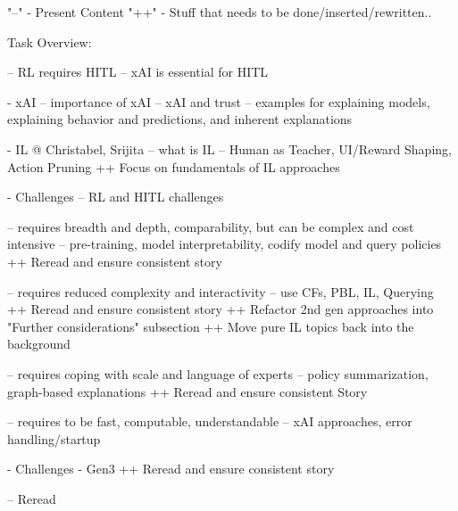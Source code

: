 "--" - Present Content
"++" - Stuff that needs to be done/inserted/rewritten..


Task Overview:

-- RL requires HITL
-- xAI is essential for HITL

- xAI
-- importance of xAI
-- xAI and trust 
-- examples for explaining models, explaining behavior and predictions, and inherent explanations

- IL @ Christabel, Srijita
-- what is IL
-- Human as Teacher, UI/Reward Shaping, Action Pruning
++ Focus on fundamentals of IL approaches

- Challenges
-- RL and HITL challenges


-- requires breadth and depth, comparability, but can be complex and cost intensive
-- pre-training, model interpretability, codify model and query policies
++ Reread and ensure consistent story

-- requires reduced complexity and interactivity
-- use CFs, PBL, IL, Querying
++ Reread and ensure consistent story
++ Refactor 2nd gen approaches into "Further considerations" subsection
++ Move pure IL topics back into the background

-- requires coping with scale and language of experts
-- policy summarization, graph-based explanations
++ Reread and ensure consistent Story

-- requires to be fast, computable, understandable
-- xAI approaches, error handling/startup

- Challenges
- Gen3
++ Reread and ensure consistent story

-- Reread